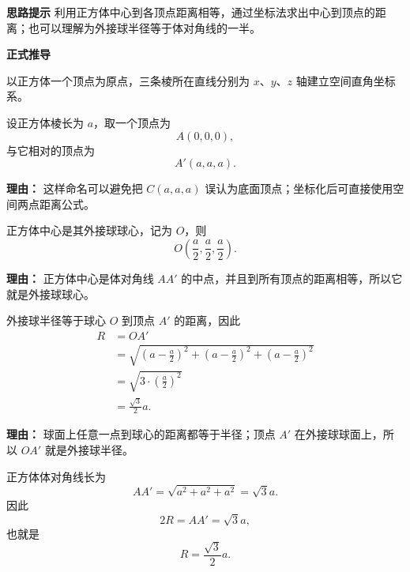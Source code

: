 \begin{proofbox}
	\textbf{\textcolor{CProof}{思路提示}}
	利用正方体中心到各顶点距离相等，通过坐标法求出中心到顶点的距离；也可以理解为外接球半径等于体对角线的一半。

	\medskip
	\textbf{\textcolor{CProof}{正式推导}}

	\begin{description}[style=nextline, leftmargin=2.8em, labelsep=0.5em, itemsep=0.55em]
		\item[\textbf{步骤一（建立坐标系）：}]
		      以正方体一个顶点为原点，三条棱所在直线分别为 $x$、$y$、$z$ 轴建立空间直角坐标系。

		      设正方体棱长为 $a$，取一个顶点为
		      \[
			      A(0,0,0),
		      \]
		      与它相对的顶点为
		      \[
			      A'(a,a,a).
		      \]

		      \par\textbf{理由：}
		      这样命名可以避免把 $C(a,a,a)$ 误认为底面顶点；坐标化后可直接使用空间两点距离公式。

		\item[\textbf{步骤二（确定球心坐标）：}]
		      正方体中心是其外接球球心，记为 $O$，则
		      \[
			      O\left(\frac{a}{2},\frac{a}{2},\frac{a}{2}\right).
		      \]

		      \par\textbf{理由：}
		      正方体中心是体对角线 $AA'$ 的中点，并且到所有顶点的距离相等，所以它就是外接球球心。

		\item[\textbf{步骤三（计算外接球半径）：}]
		      外接球半径等于球心 $O$ 到顶点 $A'$ 的距离，因此
		      \[
			      \begin{aligned}
				      R
				       & =OA'                                     \\
				       & =\sqrt{
					      \left(a-\frac{a}{2}\right)^2+
					      \left(a-\frac{a}{2}\right)^2+
					      \left(a-\frac{a}{2}\right)^2
				      }                                           \\
				       & =\sqrt{3\cdot\left(\frac{a}{2}\right)^2} \\
				       & =\frac{\sqrt{3}}{2}a.
			      \end{aligned}
		      \]

		      \par\textbf{理由：}
		      球面上任意一点到球心的距离都等于半径；顶点 $A'$ 在外接球球面上，所以 $OA'$ 就是外接球半径。

		\item[\textbf{步骤四（体对角线验证）：}]
		      正方体体对角线长为
		      \[
			      AA'=\sqrt{a^2+a^2+a^2}=\sqrt{3}a.
		      \]
		      因此
		      \[
			      2R=AA'=\sqrt{3}a,
		      \]
		      也就是
		      \[
			      R=\frac{\sqrt{3}}{2}a.
		      \]


\end{description}
\end{proofbox}
